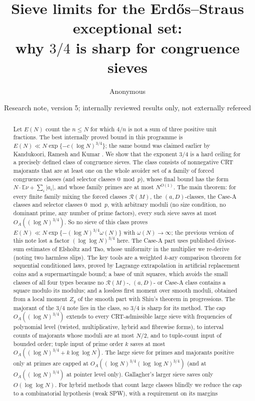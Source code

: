 \documentclass[10pt,reqno]{amsart}
\title[Sieve limits for the Erd\H{o}s--Straus exceptional set]{Sieve limits for the Erd\H{o}s--Straus exceptional set:\\ why $3/4$ is sharp for congruence sieves}
\author{Anonymous}
\date{Research note, version 5; internally reviewed results only, not externally refereed}
\theoremstyle{definition}
\theoremstyle{remark}
\newcommand{\cR}{\mathscr R}
\newcommand{\E}{\mathbb E}
\begin{document}
\begin{abstract}
Let $E(N)$ count the $n\leq N$ for which $4/n$ is not a sum of three
positive unit fractions.  The best internally proved bound in this
programme is $E(N)\ll N\exp\{-c(\log N)^{3/4}\}$; the same bound was
claimed earlier by Kandukoori, Ramesh and Kumar \cite{KRK}.  We show that the
exponent $3/4$ is a hard ceiling for a precisely defined class of
congruence sieves.  The class consists of nonnegative CRT majorants that
are at least one on the whole avoider set of a family of forced
congruence classes (and selector classes $0\bmod p$), whose final bound has the form
$N\cdot\E\nu+\sum_i|a_i|$, and whose family primes are at most
$N^{O(1)}$.  The main theorem: for every finite family mixing the
forced classes $\cR(M)$, the $(a,D)$-classes, the Case-A classes and
selector classes $0\bmod p$, with arbitrary moduli (no size condition, no
dominant prime, any number of prime factors), every such sieve saves at
most $O_A((\log N)^{3/4})$.  So no sieve of this class proves
$E(N)\ll N\exp\{-(\log N)^{3/4}\omega(N)\}$ with $\omega(N)\to\infty$; the previous
version of this note lost a factor $(\log\log N)^{3/4}$ here.  The Case-A
part uses published divisor-sum estimates of Elsholtz and Tao, whose
uniformity in the multiplier we re-derive (noting two harmless slips).
The key tools are a weighted $k$-ary comparison theorem for sequential
conditioned laws, proved by Lagrange extrapolation in artificial
replacement coins and a supermartingale bound; a base of unit squares,
which avoids the small classes of all four types because no
$\cR(M)$-, $(a,D)$- or Case-A class contains a square modulo its
modulus; and a lossless first moment over smooth moduli, obtained from a
local moment $Z_y$ of the smooth part with Shiu's theorem in
progressions.  The majorant of the $3/4$ note lies in the class, so $3/4$
is sharp for its method.  The cap $O_A((\log N)^{3/4})$ extends to every
CRT-admissible large sieve with frequencies of polynomial level
(twisted, multiplicative, hybrid and fibrewise forms), to interval counts
of majorants whose moduli are at most $N/2$, and to tuple-count input of
bounded order; tuple input of prime order $k$ saves at most
$O_A((\log N)^{3/4}+k\log\log N)$.  The large sieve for primes and majorants
positive only at primes are capped at $O_A((\log N)^{3/4}(\log\log N)^{3/4})$
(and at $O_A((\log N)^{3/4})$ at pointer level only).  Gallagher's larger
sieve saves only $O(\log\log N)$.  For
hybrid methods that count large classes blindly we reduce the cap to a
combinatorial hypothesis (weak SPW), with a requirement on its margins

\end{abstract}
\end{document}
